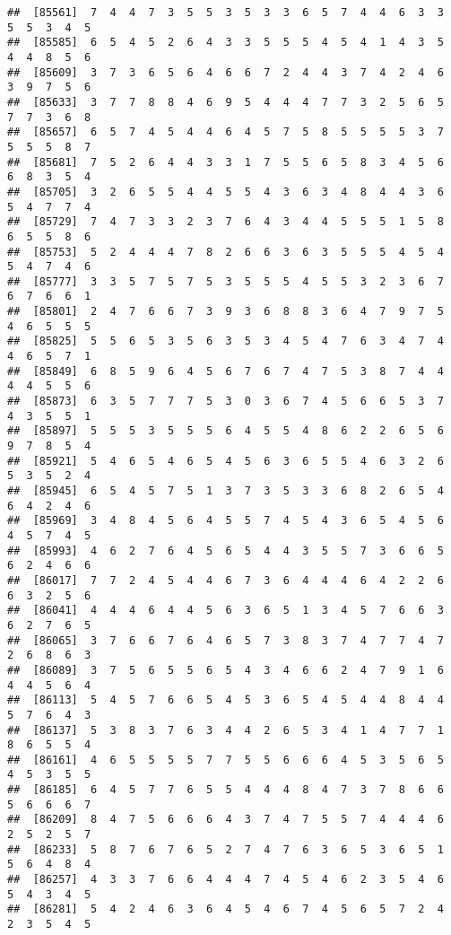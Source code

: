 \documentclass[
]{book}
\begin{document}
\begin{verbatim}
##  [85561]  7  4  4  7  3  5  5  3  5  3  3  6  5  7  4  4  6  3  3  5  5  3  4  5
##  [85585]  6  5  4  5  2  6  4  3  3  5  5  5  4  5  4  1  4  3  5  4  4  8  5  6
##  [85609]  3  7  3  6  5  6  4  6  6  7  2  4  4  3  7  4  2  4  6  3  9  7  5  6
##  [85633]  3  7  7  8  8  4  6  9  5  4  4  4  7  7  3  2  5  6  5  7  7  3  6  8
##  [85657]  6  5  7  4  5  4  4  6  4  5  7  5  8  5  5  5  5  3  7  5  5  5  8  7
##  [85681]  7  5  2  6  4  4  3  3  1  7  5  5  6  5  8  3  4  5  6  6  8  3  5  4
##  [85705]  3  2  6  5  5  4  4  5  5  4  3  6  3  4  8  4  4  3  6  5  4  7  7  4
##  [85729]  7  4  7  3  3  2  3  7  6  4  3  4  4  5  5  5  1  5  8  6  5  5  8  6
##  [85753]  5  2  4  4  4  7  8  2  6  6  3  6  3  5  5  5  4  5  4  5  4  7  4  6
##  [85777]  3  3  5  7  5  7  5  3  5  5  5  4  5  5  3  2  3  6  7  6  7  6  6  1
##  [85801]  2  4  7  6  6  7  3  9  3  6  8  8  3  6  4  7  9  7  5  4  6  5  5  5
##  [85825]  5  5  6  5  3  5  6  3  5  3  4  5  4  7  6  3  4  7  4  4  6  5  7  1
##  [85849]  6  8  5  9  6  4  5  6  7  6  7  4  7  5  3  8  7  4  4  4  4  5  5  6
##  [85873]  6  3  5  7  7  7  5  3  0  3  6  7  4  5  6  6  5  3  7  4  3  5  5  1
##  [85897]  5  5  5  3  5  5  5  6  4  5  5  4  8  6  2  2  6  5  6  9  7  8  5  4
##  [85921]  5  4  6  5  4  6  5  4  5  6  3  6  5  5  4  6  3  2  6  5  3  5  2  4
##  [85945]  6  5  4  5  7  5  1  3  7  3  5  3  3  6  8  2  6  5  4  6  4  2  4  6
##  [85969]  3  4  8  4  5  6  4  5  5  7  4  5  4  3  6  5  4  5  6  4  5  7  4  5
##  [85993]  4  6  2  7  6  4  5  6  5  4  4  3  5  5  7  3  6  6  5  6  2  4  6  6
##  [86017]  7  7  2  4  5  4  4  6  7  3  6  4  4  4  6  4  2  2  6  6  3  2  5  6
##  [86041]  4  4  4  6  4  4  5  6  3  6  5  1  3  4  5  7  6  6  3  6  2  7  6  5
##  [86065]  3  7  6  6  7  6  4  6  5  7  3  8  3  7  4  7  7  4  7  2  6  8  6  3
##  [86089]  3  7  5  6  5  5  6  5  4  3  4  6  6  2  4  7  9  1  6  4  4  5  6  4
##  [86113]  5  4  5  7  6  6  5  4  5  3  6  5  4  5  4  4  8  4  4  5  7  6  4  3
##  [86137]  5  3  8  3  7  6  3  4  4  2  6  5  3  4  1  4  7  7  1  8  6  5  5  4
##  [86161]  4  6  5  5  5  5  7  7  5  5  6  6  6  4  5  3  5  6  5  4  5  3  5  5
##  [86185]  6  4  5  7  7  6  5  5  4  4  4  8  4  7  3  7  8  6  6  5  6  6  6  7
##  [86209]  8  4  7  5  6  6  6  4  3  7  4  7  5  5  7  4  4  4  6  2  5  2  5  7
##  [86233]  5  8  7  6  7  6  5  2  7  4  7  6  3  6  5  3  6  5  1  5  6  4  8  4
##  [86257]  4  3  3  7  6  6  4  4  4  7  4  5  4  6  2  3  5  4  6  5  4  3  4  5
##  [86281]  5  4  2  4  6  3  6  4  5  4  6  7  4  5  6  5  7  2  4  2  3  5  4  5

\end{verbatim}
\end{document}
